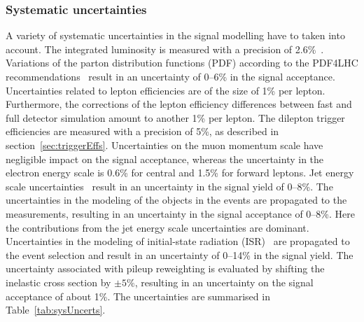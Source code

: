 \subsubsection{Systematic uncertainties}
A variety of systematic uncertainties in the signal modelling have to taken into account. The integrated luminosity is measured with a precision of 2.6\%~\cite{CMS-PAS-LUM-13-001}. Variations of the parton distribution functions (PDF) according to the PDF4LHC recommendations~\cite{Alekhin:2011sk,Botje:2011sn,Ball:2012cx,Martin:2009iq,Lai:2010vv} result in an uncertainty of 0--6\% in the signal acceptance. Uncertainties related to lepton efficiencies are of the size of 1\% per lepton. Furthermore, the corrections of the lepton efficiency differences between fast and full detector simulation amount to another 1\% per lepton. The dilepton trigger efficiencies are measured with a precision of 5\%, as described in section~\ref{sec:triggerEffs}. Uncertainties on the muon momentum scale have negligible impact on the signal acceptance, whereas the uncertainty in the electron energy scale is 0.6\% for central and 1.5\% for forward leptons. Jet energy scale uncertainties~\cite{1748-0221-6-11-P11002} result in an uncertainty in the signal yield of 0--8\%. The uncertainties in the modeling of the objects in the events are propagated to the \MET measurements, resulting in an uncertainty in the signal acceptance of 0--8\%. Here the contributions from the jet energy scale uncertainties are dominant. 
Uncertainties in the modeling of initial-state radiation (ISR)~\cite{Chatrchyan:2013xna} are propagated to the event selection and result in an uncertainty of 0--14\% in the signal yield.
The uncertainty associated with pileup reweighting is evaluated by shifting the inelastic cross section by $\pm5\%$, resulting in an uncertainty on the signal acceptance of about 1\%. The uncertainties are summarised in Table~\ref{tab:sysUncerts}.

